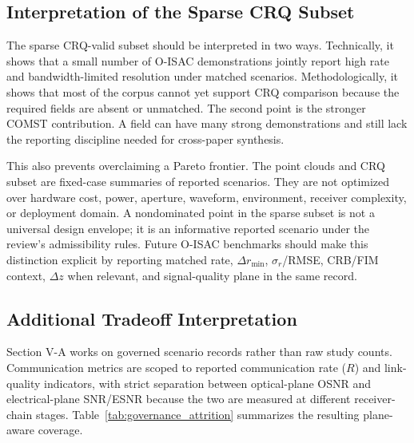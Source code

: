 \documentclass[letterpaper,journal]{IEEEtran}
\begin{document}
\subsection{Interpretation of the Sparse CRQ Subset}

The sparse CRQ-valid subset should be interpreted in two ways. Technically, it shows that a small number of O-ISAC demonstrations jointly report high rate and bandwidth-limited resolution under matched scenarios. Methodologically, it shows that most of the corpus cannot yet support CRQ comparison because the required fields are absent or unmatched. The second point is the stronger COMST contribution. A field can have many strong demonstrations and still lack the reporting discipline needed for cross-paper synthesis.

This also prevents overclaiming a Pareto frontier. The point clouds and CRQ subset are fixed-case summaries of reported scenarios. They are not optimized over hardware cost, power, aperture, waveform, environment, receiver complexity, or deployment domain. A nondominated point in the sparse subset is not a universal design envelope; it is an informative reported scenario under the review's admissibility rules. Future O-ISAC benchmarks should make this distinction explicit by reporting matched rate, \(\Delta r_{\min}\), \(\sigma_r\)/RMSE, CRB/FIM context, \(\Delta z\) when relevant, and signal-quality plane in the same record.

\subsection{Additional Tradeoff Interpretation}

Section V-A works on governed scenario records rather than raw study counts. Communication metrics are scoped to reported communication rate ($R$) and link-quality indicators, with strict separation between optical-plane OSNR and electrical-plane SNR/ESNR because the two are measured at different receiver-chain stages. Table~\ref{tab:governance_attrition} summarizes the resulting plane-aware coverage.
\end{document}
